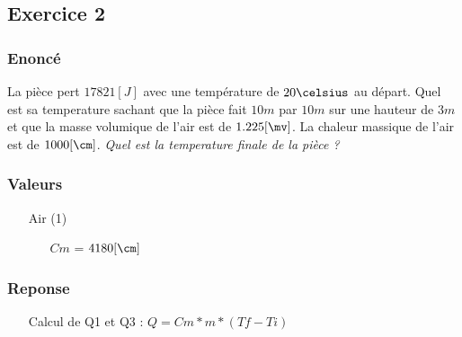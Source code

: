 
\subsection{Exercice 2}
\subsubsection{Enoncé}
La pièce pert $17821[J]$ avec une température de $20\celsius$ au départ. Quel est sa temperature sachant que la pièce fait $10m$ par $10m$ sur une hauteur de $3m$ et que la masse volumique de l'air est de $1.225[\mv]$. La chaleur massique de l'air est de $1000[\cm]$.
\textit{Quel est la temperature finale de la pièce ?}
\subsubsection{Valeurs}
\begin{itemize}
    \item[Air] (1)
    \item[] 
    \begin{itemize}
        \item[$Cm$] = $4180[\cm]$
    \end{itemize}
\end{itemize}
\subsubsection{Reponse}
\begin{itemize}
    \item[Calcul de Q1 et Q3] : $Q = Cm * m * (Tf-Ti)$
\end{itemize}
